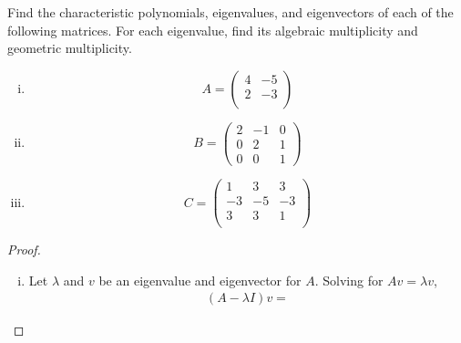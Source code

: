\begin{question}
\normalfont
Find the characteristic polynomials, eigenvalues, and eigenvectors of each of the following matrices. For each eigenvalue, find its algebraic multiplicity and geometric multiplicity.
\begin{enumerate}[(i)]
\item
\[
A= \begin{pmatrix}
            4 & -5\\
            2 & -3\\
        \end{pmatrix}
\]

\item
\[
B= \begin{pmatrix}
            2 & -1 & 0\\
            0 & 2 & 1\\
            0 & 0 & 1
        \end{pmatrix}
\]
\item
\[
C= \begin{pmatrix}
            1 & 3 & 3\\
            -3 & -5 & -3\\
            3 & 3 & 1 \\
        \end{pmatrix}
\]
\end{enumerate}

\end{question}

\begin{proof}
    \begin{enumerate}[(i)]
        \item Let $\lambda$ and $v$ be an eigenvalue and eigenvector for $A$.
        Solving for $Av=\lambda v$, 
        \[
            \begin{aligned}
                (A-\lambda I)v=
            \end{aligned}
        \]
    \end{enumerate}
    
\end{proof}